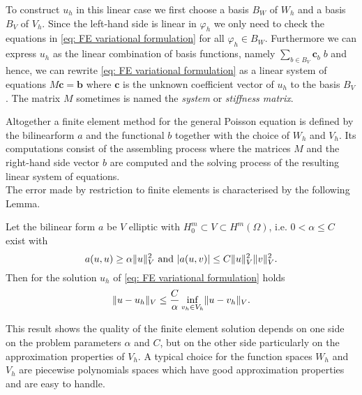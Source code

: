 \begin{definition} 
To construct $u_h$ in this linear case we first choose a basis $B_W$ of $W_h$ and a basis $B_V$ of $V_h$.
Since the left-hand side is linear in $\varphi_h$ we only need to check the equations in \eqref{eq: FE variational formulation} for all $\varphi_h \in B_W$. 
Furthermore we can express $u_h$ as the linear combination of basis functions, namely $\sum_{b \in B_V} \mathbf{c}_b \; b$ and hence, we can rewrite \eqref{eq: FE variational formulation} as a linear system of equations $M \mathbf{c} = \mathbf{b}$ where  $\mathbf{c}$ is the unknown coefficient vector of $u_h$ to the basis $B_V$.  The matrix $M$ sometimes is named the \emph{system} or \emph{stiffness matrix}.

Altogether a finite element method for the general Poisson equation is defined by the bilinearform $a$ and the functional $b$ together with the choice of $W_h$ and $V_h$. Its computations consist of the assembling process where the matrices $M$ and the right-hand side vector $b$ are computed and the solving process of the resulting linear system of equations.\\
The error made by restriction to finite elements is characterised by the following Lemma.
\begin{lemma} \label{la: Ceas lemma}
	Let the bilinear form $a$ be $V$ elliptic with $H_0^m \subset V \subset H^m(\Omega) $, i.e. $0 < \alpha \leq C$ exist with
	\[
		a(u,u) \geq \alpha  \lVert u \rVert ^2_V \text{ and } |a(u,v)| \leq C \lVert u \rVert ^2_V \lVert v \rVert ^2_V.
	\]
	Then for the solution $u_h$ of \eqref{eq: FE variational formulation}  holds
	\begin{align}
		\lVert u - u_h \rVert_V \leq \frac C \alpha \inf\limits_{v_h \in V_h} \lVert u-v_h \rVert_V.
	\end{align}
\end{lemma}
This result shows the quality of the finite element solution depends on one side on the problem parameters $\alpha$ and $C$, but on the other side particularly on the approximation properties of $V_h$. A typical choice for the function spaces $W_h$ and $V_h$ are piecewise polynomials spaces which have good approximation properties and are easy to handle.


\end{definition}
